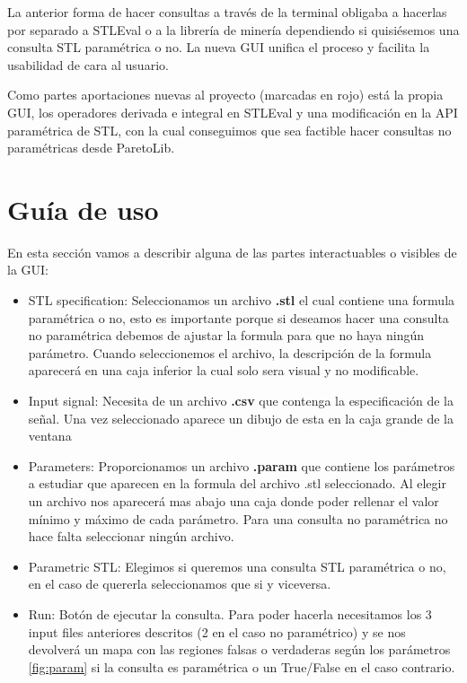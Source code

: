 La anterior forma de hacer consultas a través de la terminal obligaba a hacerlas por separado a STLEval o a la librería de minería dependiendo si quisiésemos una consulta STL paramétrica o no. La nueva GUI unifica el proceso y facilita la usabilidad de cara al usuario.

Como partes aportaciones nuevas al proyecto (marcadas en rojo) está la propia GUI, los operadores derivada e integral en STLEval y una modificación en la API paramétrica de STL, con la cual conseguimos que sea factible hacer consultas no paramétricas desde ParetoLib.

\section{Guía de uso}
En esta sección vamos a describir alguna de las partes interactuables o visibles de la GUI:

\begin{itemize}
\item STL specification: Seleccionamos un archivo \textbf{.stl} el cual contiene una formula paramétrica o no, esto es importante porque si deseamos hacer una consulta no paramétrica debemos de ajustar la formula para que no haya ningún parámetro. Cuando seleccionemos el archivo, la descripción de la formula aparecerá en una caja inferior la cual solo sera visual y no modificable.

\item Input signal: Necesita de un archivo \textbf{.csv} que contenga la especificación de la señal. Una vez seleccionado aparece un dibujo de esta en la caja grande de la ventana

\item Parameters: Proporcionamos un archivo \textbf{.param} que contiene los parámetros a estudiar que aparecen en la formula del archivo .stl seleccionado. Al elegir un archivo nos aparecerá mas abajo una caja donde poder rellenar el valor mínimo y máximo de cada parámetro. Para una consulta no paramétrica no hace falta seleccionar ningún archivo.

\item Parametric STL: Elegimos si queremos una consulta STL paramétrica o no, en el caso de quererla seleccionamos que si y viceversa.

\item Run: Botón de ejecutar la consulta. Para poder hacerla necesitamos los 3 input files anteriores descritos (2 en el caso no paramétrico) y se nos devolverá un mapa con las regiones falsas o verdaderas según los parámetros \ref{fig:param} si la consulta es paramétrica o un True/False en el caso contrario. 
\end{itemize}
